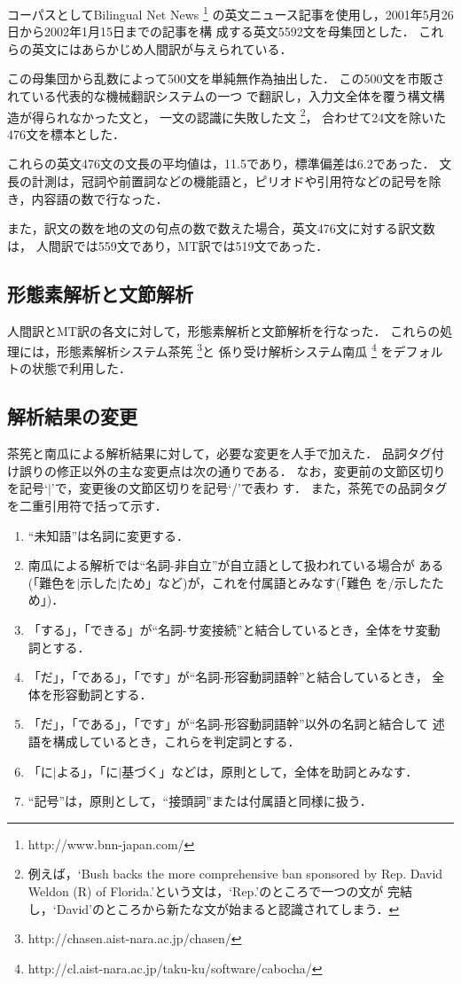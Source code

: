 コーパスとしてBilingual Net News
\footnote{http://www.bnn-japan.com/}
の英文ニュース記事を使用し，2001年5月26日から2002年1月15日までの記事を構
成する英文5592文を母集団とした．
これらの英文にはあらかじめ人間訳が与えられている．

この母集団から乱数によって500文を単純無作為抽出した．
この500文を市販されている代表的な機械翻訳システムの一つ
で翻訳し，入力文全体を覆う構文構造が得られなかった文と，
一文の認識に失敗した文
\footnote{例えば，`Bush backs the more comprehensive ban sponsored by 
Rep. David Weldon (R) of Florida.'という文は，`Rep.'のところで一つの文が
完結し，`David'のところから新たな文が始まると認識されてしまう．}，
合わせて24文を除いた476文を標本とした．

これらの英文476文の文長の平均値は，11.5であり，標準偏差は6.2であった．
文長の計測は，冠詞や前置詞などの機能語と，ピリオドや引用符などの記号を除
き，内容語の数で行なった．

また，訳文の数を地の文の句点の数で数えた場合，英文476文に対する訳文数は，
人間訳では559文であり，MT訳では519文であった．


\subsection{形態素解析と文節解析}
\label{sec:method:parse}

人間訳とMT訳の各文に対して，形態素解析と文節解析を行なった．
これらの処理には，形態素解析システム茶筅
\footnote{http://chasen.aist-nara.ac.jp/chasen/}と
係り受け解析システム南瓜
\footnote{http://cl.aist-nara.ac.jp/taku-ku/software/cabocha/}
をデフォルトの状態で利用した． 


\subsection{解析結果の変更}
\label{sec:method:modify}

茶筅と南瓜による解析結果に対して，必要な変更を人手で加えた．
品詞タグ付け誤りの修正以外の主な変更点は次の通りである．
なお，変更前の文節区切りを記号`$|$'で，変更後の文節区切りを記号`/'で表わ
す．  
また，茶筅での品詞タグを二重引用符で括って示す．
\begin{enumerate}
\item
``未知語''は名詞に変更する．
\item
南瓜による解析では``名詞-非自立''が自立語として扱われている場合が
ある(「難色を$|$示した$|$ため」など)が，これを付属語とみなす(「難色
を/示したため」)．
\item 
「する」，「できる」が``名詞-サ変接続''と結合しているとき，全体をサ変動
詞とする．
\item 
「だ」，「である」，「です」が``名詞-形容動詞語幹''と結合しているとき，
全体を形容動詞とする．
\item
「だ」，「である」，「です」が``名詞-形容動詞語幹''以外の名詞と結合して
述語を構成しているとき，これらを判定詞とする．
\item 
「に$|$よる」，「に$|$基づく」などは，原則として，全体を助詞とみなす．
\item 
``記号''は，原則として，``接頭詞''または付属語と同様に扱う．
\end{enumerate}


